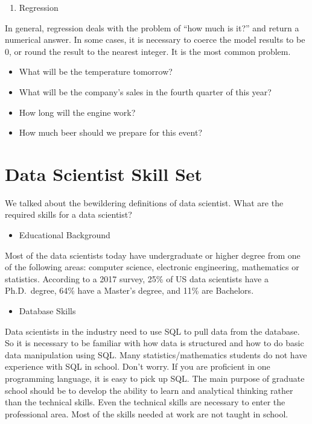 \documentclass[12pt,]{krantz}
\providecommand{\tightlist}{%
  \setlength{\itemsep}{0pt}\setlength{\parskip}{0pt}}
\theoremstyle{definition}
\theoremstyle{definition}
\theoremstyle{remark}
\begin{document}
\begin{enumerate}
\def\labelenumi{\arabic{enumi}.}
\setcounter{enumi}{4}
\tightlist
\item
  Regression
\end{enumerate}

In general, regression deals with the problem of ``how much is it?'' and
return a numerical answer. In some cases, it is necessary to coerce the
model results to be 0, or round the result to the nearest integer. It is
the most common problem.

\begin{itemize}
\tightlist
\item
  What will be the temperature tomorrow?
\item
  What will be the company's sales in the fourth quarter of this year?
\item
  How long will the engine work?
\item
  How much beer should we prepare for this event?
\end{itemize}

\section{Data Scientist Skill Set}\label{data-scientist-skill-set}

We talked about the bewildering definitions of data scientist. What are
the required skills for a data scientist?

\begin{itemize}
\tightlist
\item
  Educational Background
\end{itemize}

Most of the data scientists today have undergraduate or higher degree
from one of the following areas: computer science, electronic
engineering, mathematics or statistics. According to a 2017 survey, 25\%
of US data scientists have a Ph.D.~degree, 64\% have a Master's degree,
and 11\% are Bachelors.

\begin{itemize}
\tightlist
\item
  Database Skills
\end{itemize}

Data scientists in the industry need to use SQL to pull data from the
database. So it is necessary to be familiar with how data is structured
and how to do basic data manipulation using SQL. Many
statistics/mathematics students do not have experience with SQL in
school. Don't worry. If you are proficient in one programming language,
it is easy to pick up SQL. The main purpose of graduate school should be
to develop the ability to learn and analytical thinking rather than the
technical skills. Even the technical skills are necessary to enter the
professional area. Most of the skills needed at work are not taught in
school.
\end{document}
